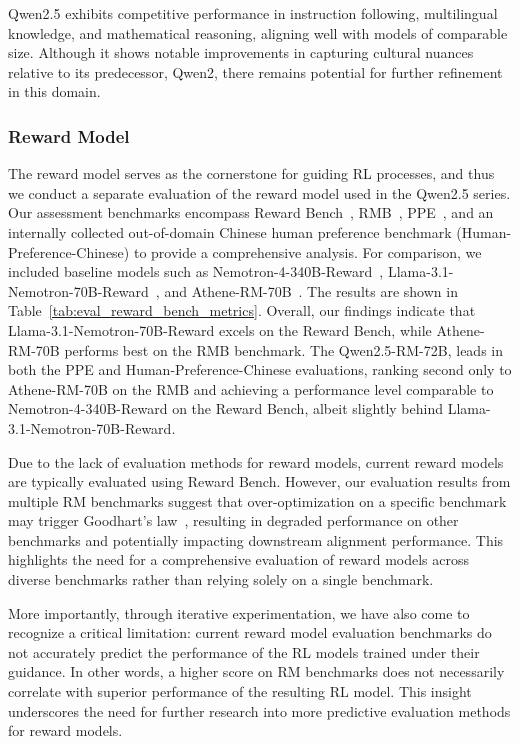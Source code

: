 Qwen2.5 exhibits competitive performance in instruction following, multilingual knowledge, and mathematical reasoning, aligning well with models of comparable size. Although it shows notable improvements in capturing cultural nuances relative to its predecessor, Qwen2, there remains potential for further refinement in this domain.



\subsubsection{Reward Model}

The reward model serves as the cornerstone for guiding RL processes, and thus we conduct a separate evaluation of the reward model used in the Qwen2.5 series. Our assessment benchmarks encompass Reward Bench~\citep{Lambert2024RewardBenchER}, RMB~\citep{Zhou2024RMBCB}, PPE~\citep{Frick2024HowTE}, and an internally collected out-of-domain Chinese human preference benchmark (Human-Preference-Chinese) to provide a comprehensive analysis.
For comparison, we included baseline models such as Nemotron-4-340B-Reward~\citep{Adler2024Nemotron43T}, Llama-3.1-Nemotron-70B-Reward~\citep{Wang2024HelpSteer2PreferenceCR}, and Athene-RM-70B~\citep{Athene2024}. The results are shown in Table~\ref{tab:eval_reward_bench_metrics}. Overall, our findings indicate that Llama-3.1-Nemotron-70B-Reward excels on the Reward Bench, while Athene-RM-70B performs best on the RMB benchmark. The Qwen2.5-RM-72B, leads in both the PPE and Human-Preference-Chinese evaluations, ranking second only to Athene-RM-70B on the RMB and achieving a performance level comparable to Nemotron-4-340B-Reward on the Reward Bench, albeit slightly behind Llama-3.1-Nemotron-70B-Reward.

Due to the lack of evaluation methods for reward models, current reward models are typically evaluated using Reward Bench. However, our evaluation results from multiple RM benchmarks suggest that over-optimization on a specific benchmark may trigger Goodhart's law~\citep{hoskin1996}, resulting in degraded performance on other benchmarks and potentially impacting downstream alignment performance. This highlights the need for a comprehensive evaluation of reward models across diverse benchmarks rather than relying solely on a single benchmark.

More importantly, through iterative experimentation, we have also come to recognize a critical limitation: current reward model evaluation benchmarks do not accurately predict the performance of the RL models trained under their guidance. In other words, a higher score on RM benchmarks does not necessarily correlate with superior performance of the resulting RL model. This insight underscores the need for further research into more predictive evaluation methods for reward models.


